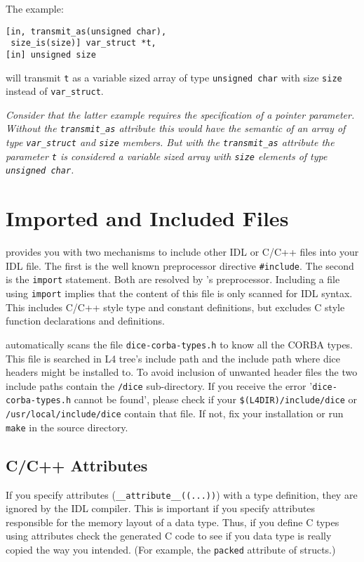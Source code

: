 The example:
\begin{verbatim}
[in, transmit_as(unsigned char),
 size_is(size)] var_struct *t,
[in] unsigned size
\end{verbatim}
will transmit \verb|t| as a variable sized array of type \verb|unsigned char|
with size \verb|size| instead of \verb|var_struct|.

{\em Consider that the latter example requires the specification of
a pointer parameter. Without the \verb|transmit_as| attribute this
would have the semantic of an array of type \verb|var_struct| and
\verb|size| members. But with the \verb|transmit_as| attribute the
parameter \verb|t| is considered a variable sized array with 
\verb|size| elements of type \verb|unsigned char|.}

\section{Imported and Included Files}
\label{sec:import}

\dice{} provides you with two mechanisms to include other IDL or
C/C++ files into your IDL file. The first is the well known 
preprocessor directive \verb|#include|. The second is the \verb|import|
statement. Both are resolved by \dice{}'s preprocessor.
Including a file using \verb|import| implies that the content 
of this file is only scanned for IDL syntax. This includes
C/C++ style type and constant definitions, but excludes C style 
function declarations and definitions.

\dice{} automatically scans the file \verb|dice-corba-types.h|
to know all the CORBA types. This file is searched in L4 tree's
include path and the include path where dice headers might be
installed to. To avoid inclusion of unwanted header files the
two include paths contain the \verb|/dice| sub-directory.
If you receive the error '\verb|dice-corba-types.h| cannot
be found', please check if your \verb|$(L4DIR)/include/dice| or
\verb|/usr/local/include/dice| contain that file. If not, fix
your installation or run \verb|make| in the \dice{} source
directory.

\subsection{C/C++ Attributes}
If you specify attributes (\verb|__attribute__((...))|)
with a type definition, they are ignored by the IDL compiler. This is
important if you specify attributes responsible for the memory
layout of a data type. Thus, if you define C types using attributes
check the generated C code to see if you data type is really copied
the way you intended. (For example, the \verb|packed| attribute of
structs.)

